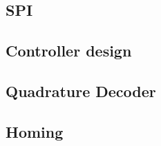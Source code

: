 \documentclass[../../main]{subfiles}
\begin{document}
\subsection{SPI}%
\label{sub:spi}



\subsection{Controller design}%
\label{sec:controller_design}





\subsection{Quadrature Decoder}%
\label{sub:quadraturdecoder}


\subsection{Homing}
\label{sub:homing}

\end{document}
